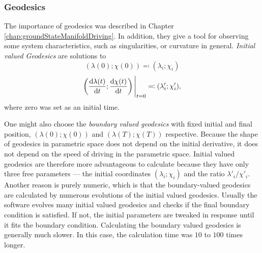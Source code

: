 \newpage
\subsubsection{Geodesics}
The importance of geodesics was described in Chapter \ref{chap:groundStateManifoldDriving}. In addition, they give a tool for observing some system characteristics, such as singularities, or curvature in general. \emph{Initial valued Geodesics} are solutions to
\begin{equation}
    (\lambda(0);\chi(0))\eqqcolon (\lambda_i;\chi_i)
\end{equation}
\begin{equation}
    \left(\frac{\mathrm{d} \lambda(t)}{\mathrm{d} t};\frac{\mathrm{d} \chi(t)}{\mathrm{d} t}\right)\Bigg|_{t=0} \eqqcolon (\lambda'_i;\chi'_i),
\end{equation}
where zero was set as an initial time.

One might also choose the \emph{boundary valued geodesics} with fixed initial and final position, $(\lambda(0);\chi(0))$ and $(\lambda(T);\chi(T))$ respective. Because the shape of geodesics in parametric space does not depend on the initial derivative, it does not depend on the speed of driving in the parametric space. Initial valued geodesics are therefore more advantageous to calculate because they have only three free parameters — the initial coordinates $(\lambda_i;\chi_i)$ and the ratio $\lambda'_i/\chi'_i$. Another reason is purely numeric, which is that the boundary-valued geodesics are calculated by numerous evolutions of the initial valued geodesics. Usually the software evolves many initial valued geodesics and checks if the final boundary condition is satisfied. If not, the initial parameters are tweaked in response until it fits the boundary condition. Calculating the boundary valued geodesics is generally much slower. In this case, the calculation time was $10$ to $100$ times longer.

